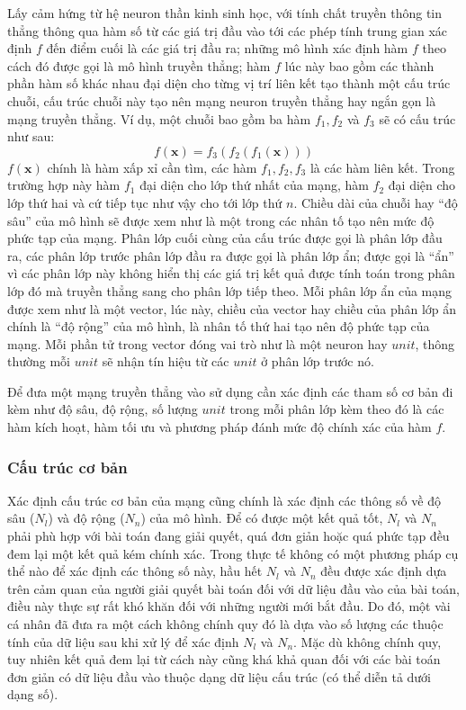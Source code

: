 \documentclass[12pt,a4paper]{report}
\begin{document}
Lấy cảm hứng từ hệ neuron thần kinh sinh học, với tính chất truyền thông tin thẳng thông qua hàm số từ các giá trị đầu vào tới các phép tính trung gian xác định $f$ đến điểm cuối là các giá trị đầu ra; những mô hình xác định hàm $f$ theo cách đó được gọi là mô hình truyền thẳng; hàm $f$ lúc này bao gồm các thành phần hàm số khác nhau đại diện cho từng vị trí liên kết tạo thành một cấu trúc chuỗi, cấu trúc chuỗi này tạo nên mạng neuron truyền thẳng hay ngắn gọn là mạng truyền thẳng. Ví dụ, một chuỗi bao gồm ba hàm $f_1, f_2$ và $f_3$ sẽ có cấu trúc như sau:
	\begin{equation}
		f(\mathbf{x}) = f_3(f_2(f_1(\mathbf{x})))
	\end{equation}
$f(\mathbf{x})$ chính là hàm xấp xỉ cần tìm, các hàm $f_1, f_2, f_3$ là các hàm liên kết. Trong trường hợp này hàm $f_1$ đại diện cho lớp thứ nhất của mạng, hàm $f_2$ đại diện cho lớp thứ hai và cứ tiếp tục như vậy cho tới lớp thứ $n$. Chiều dài của chuỗi  hay ``độ sâu'' của mô hình sẽ được xem như là một trong các nhân tố tạo nên mức độ phức tạp của mạng. Phân lớp cuối cùng của cấu trúc được gọi là phân lớp đầu ra, các phân lớp trước phân lớp đầu ra được gọi là phân lớp ẩn; được gọi là ``ẩn'' vì các phân lớp này không hiển thị các giá trị kết quả được tính toán trong phân lớp đó mà truyền thẳng sang cho phân lớp tiếp theo. Mỗi phân lớp ẩn của mạng được xem như là một vector, lúc này, chiều của vector hay chiều của phân lớp ẩn chính là ``độ rộng'' của mô hình, là nhân tố thứ hai tạo nên độ phức tạp của mạng. Mỗi phần tử trong vector đóng vai trò như là một neuron hay $unit$, thông thường mỗi $unit$ sẽ nhận tín hiệu từ các $unit$ ở phân lớp trước nó.

Để đưa một mạng truyền thẳng vào sử dụng cần xác định các tham số cơ bản đi kèm như độ sâu, độ rộng, số lượng $unit$ trong mỗi phân lớp kèm theo đó là các hàm kích hoạt, hàm tối ưu và phương pháp đánh mức độ chính xác của hàm $f$.\\

\subsubsection{Cấu trúc cơ bản}
Xác định cấu trúc cơ bản của mạng cũng chính là xác định các thông số về độ sâu ($N_l$) và độ rộng ($N_n$) của mô hình. Để có được một kết quả tốt, $N_l$ và $N_n$ phải phù hợp với bài toán đang giải quyết, quá đơn giản hoặc quá phức tạp đều đem lại một kết quả kém chính xác. Trong thực tế không có một phương pháp cụ thể nào để xác định các thông số này, hầu hết $N_l$ và $N_n$ đều được xác định dựa trên cảm quan của người giải quyết bài toán đối với dữ liệu đầu vào của bài toán, điều này thực sự rất khó khăn đối với những người mới bắt đầu. Do đó, một vài cá nhân đã đưa ra một cách không chính quy đó là dựa vào số lượng các thuộc tính của dữ liệu sau khi xử lý để xác định $N_l$ và $N_n$. Mặc dù không chính quy, tuy nhiên kết quả đem lại từ cách này cũng khá khả quan đối với các bài toán đơn giản có dữ liệu đầu vào thuộc dạng dữ liệu cấu trúc (có thể diễn tả dưới dạng số).
\end{document}
